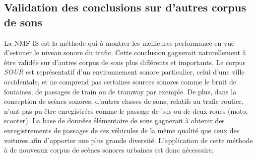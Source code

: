 \subsection*{Validation des conclusions sur d'autres corpus de sons}
La NMF IS  est la méthode qui à montrer les meilleures performance en vue d'estimer le niveau sonore du trafic.  Cette conclusion gagnerait naturellement à être validée sur d'autres corpus de sons plus différents et importants. Le corpus \textit{SOUR} est représentatif d'un environnement sonore particulier, celui d'une ville occidentale, et ne comprend pas certaines sources sonores comme le bruit de fontaines, de passages de train ou de tramway par exemple. De plus, dans la conception de scènes sonores, d'autres classes de sons, relatifs au trafic routier, n'ont pas pu être enregistrées comme le passage de bus ou de deux roues (moto, scooter). La base de données élémentaire de sons gagnerait à obtenir des enregistrements de passages de ces véhicules de la même qualité que ceux des voitures afin d'apporter une plus grande diversité. L'application de cette méthode à de nouveaux corpus de scènes sonores urbaines est donc nécessaire.

